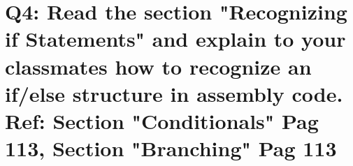 \documentclass[10pt,a4paper]{article} %
\begin{document}
    \section{Q4: Read the section "Recognizing if Statements" and explain to
        your classmates how to recognize an if/else structure in assembly code.
        Ref: Section "Conditionals" Pag 113, Section "Branching" Pag 113}


%
%
%
%
%
%
%
%
%
%
%








    \nocite{*}
    
    
\end{document}

